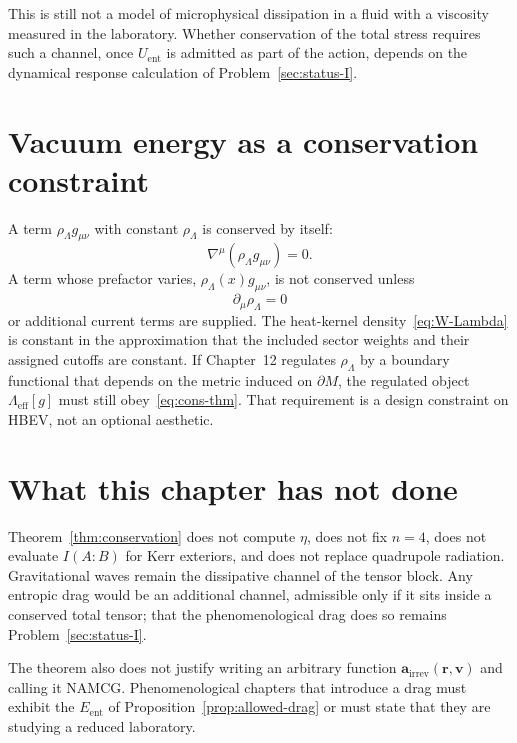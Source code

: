 This is still not a model of microphysical dissipation in a fluid
with a viscosity measured in the laboratory. Whether conservation
of the total stress requires such a channel, once \(U_{\mathrm{ent}}\)
is admitted as part of the action, depends on the dynamical response
calculation of Problem~\ref{sec:status-I}.

\section{Vacuum energy as a conservation constraint}
\label{sec:ch11-vacuum}

A term \(\rho_\Lambda g_{\mu\nu}\) with constant \(\rho_\Lambda\) is
conserved by itself:
\begin{equation}
  \label{eq:Lambda-cons}
  \nabla^\mu(\rho_\Lambda g_{\mu\nu})=0.
\end{equation}
A term whose prefactor varies, \(\rho_\Lambda(x)g_{\mu\nu}\), is
not conserved unless
\begin{equation}
  \label{eq:Lambda-var}
  \partial_\mu\rho_\Lambda=0
\end{equation}
or additional current terms are supplied. The heat-kernel
density~\eqref{eq:W-Lambda} is constant in the approximation that
the included sector weights and their assigned cutoffs are constant.
If Chapter~12
regulates \(\rho_\Lambda\) by a boundary functional that depends on
the metric induced on \(\partial M\), the regulated object
\(\Lambda_{\mathrm{eff}}[g]\) must still obey~\eqref{eq:cons-thm}.
That requirement is a design constraint on HBEV, not an optional
aesthetic.

\section{What this chapter has not done}
\label{sec:ch11-not}

Theorem~\ref{thm:conservation} does not compute \(\eta\), does not
fix \(n=4\), does not evaluate \(I(A:B)\) for Kerr exteriors, and
does not replace quadrupole radiation. Gravitational waves remain
the dissipative channel of the tensor block. Any entropic drag
would be an additional channel, admissible only if it sits inside a
conserved total tensor; that the phenomenological drag does so
remains Problem~\ref{sec:status-I}.

The theorem also does not justify writing an arbitrary function
\(\mathbf{a}_{\mathrm{irrev}}(\mathbf{r},\mathbf{v})\) and calling it
NAMCG. Phenomenological chapters that introduce a drag must exhibit
the \(E_{\mathrm{ent}}\) of Proposition~\ref{prop:allowed-drag} or
must state that they are studying a reduced laboratory.

